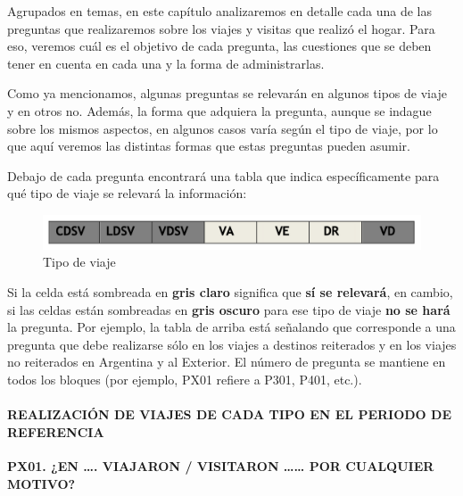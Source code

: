 \documentclass[
  openany]{book}
\begin{document}
Agrupados en temas, en este capítulo analizaremos en detalle cada una de las preguntas que realizaremos sobre los viajes y visitas que realizó el hogar. Para eso, veremos cuál es el objetivo de cada pregunta, las cuestiones que se deben tener en cuenta en cada una y la forma de administrarlas.

Como ya mencionamos, algunas preguntas se relevarán en algunos tipos de viaje y en otros no. Además, la forma que adquiera la pregunta, aunque se indague sobre los mismos aspectos, en algunos casos varía según el tipo de viaje, por lo que aquí veremos las distintas formas que estas preguntas pueden asumir.

Debajo de cada pregunta encontrará una tabla que indica específicamente para qué tipo de viaje se relevará la información:

\begin{figure}

{\centering \includegraphics[width=1\linewidth]{imagenes/figura6-72} 

}

\caption{Tipo de viaje}\label{fig:deta2}
\end{figure}

Si la celda está sombreada en \textbf{gris claro} significa que \textbf{sí se relevará}, en cambio, si las celdas están sombreadas en \textbf{gris oscuro} para ese tipo de viaje \textbf{no se hará} la pregunta. Por ejemplo, la tabla de arriba está señalando que corresponde a una pregunta que debe realizarse sólo en los viajes a destinos reiterados y en los viajes no reiterados en Argentina y al Exterior. El número de pregunta se mantiene en todos los bloques (por ejemplo, PX01 refiere a P301, P401, etc.).

\hypertarget{realizaciuxf3n-de-viajes-de-cada-tipo-en-el-periodo-de-referencia}{%
\paragraph{\texorpdfstring{\textbf{REALIZACIÓN DE VIAJES DE CADA TIPO EN EL PERIODO DE REFERENCIA}}{REALIZACIÓN DE VIAJES DE CADA TIPO EN EL PERIODO DE REFERENCIA}}\label{realizaciuxf3n-de-viajes-de-cada-tipo-en-el-periodo-de-referencia}}

\textbf{PX01. ¿EN \ldots. VIAJARON / VISITARON \ldots\ldots{} POR CUALQUIER MOTIVO?}
\end{document}
